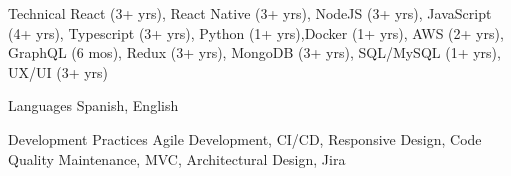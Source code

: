 \begin{cvskills}

  \cvskill
  {Technical} %
  {React (3+ yrs), React Native (3+ yrs), NodeJS (3+ yrs), JavaScript (4+ yrs), Typescript (3+ yrs), Python (1+ yrs),\break Docker (1+ yrs), AWS (2+ yrs), GraphQL (6 mos), Redux (3+ yrs), MongoDB (3+ yrs), SQL/MySQL (1+ yrs), UX/UI (3+ yrs)} %

  \cvskill
  {Languages} %
  {Spanish, English} %

  \cvskill
  {Development Practices} %
  {Agile Development, CI/CD, Responsive Design, Code Quality Maintenance, MVC, Architectural Design, Jira} %

\end{cvskills}
